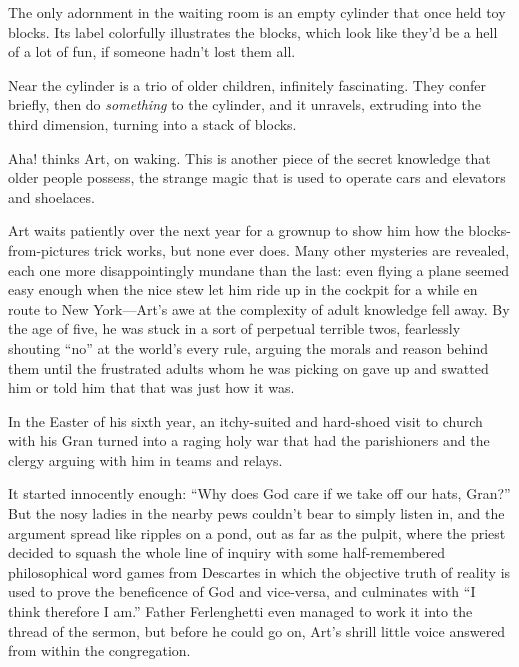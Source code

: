The only adornment in the waiting room is an empty cylinder that
once held toy blocks. Its label colorfully illustrates the blocks,
which look like they’d be a hell of a lot of fun, if someone hadn’t
lost them all.

Near the cylinder is a trio of older children, infinitely
fascinating. They confer briefly, then do \emph{something} to the
cylinder, and it unravels, extruding into the third dimension,
turning into a stack of blocks.

Aha! thinks Art, on waking. This is another piece of the secret
knowledge that older people possess, the strange magic that is used
to operate cars and elevators and shoelaces.

Art waits patiently over the next year for a grownup to show him
how the blocks-from-pictures trick works, but none ever does. Many
other mysteries are revealed, each one more disappointingly mundane
than the last: even flying a plane seemed easy enough when the nice
stew let him ride up in the cockpit for a while en route to New
York—Art’s awe at the complexity of adult knowledge fell away. By
the age of five, he was stuck in a sort of perpetual terrible twos,
fearlessly shouting “no” at the world’s every rule, arguing the
morals and reason behind them until the frustrated adults whom he
was picking on gave up and swatted him or told him that that was
just how it was.

In the Easter of his sixth year, an itchy-suited and hard-shoed
visit to church with his Gran turned into a raging holy war that
had the parishioners and the clergy arguing with him in teams and
relays.

It started innocently enough: “Why does God care if we take off our
hats, Gran?” But the nosy ladies in the nearby pews couldn’t bear
to simply listen in, and the argument spread like ripples on a
pond, out as far as the pulpit, where the priest decided to squash
the whole line of inquiry with some half-remembered philosophical
word games from Descartes in which the objective truth of reality
is used to prove the beneficence of God and vice-versa, and
culminates with “I think therefore I am.” Father Ferlenghetti even
managed to work it into the thread of the sermon, but before he
could go on, Art’s shrill little voice answered from within the
congregation.

